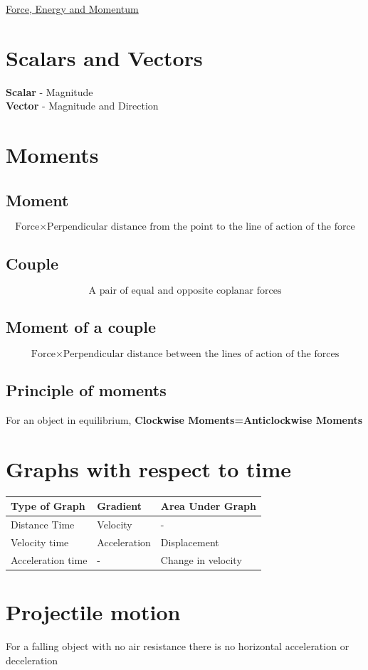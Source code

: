 \documentclass{article}[18pt]
\begin{document}
\begin{center}
\underline{\huge Force, Energy and Momentum}
\end{center}
\section{Scalars and Vectors}
\textbf{Scalar} - Magnitude\\
\textbf{Vector} - Magnitude and Direction
\section{Moments}
\subsection{Moment}
$$\text{Force}\times \text{Perpendicular distance from the point to the line of action of the force}$$
\subsection{Couple}
$$\text{A pair of equal and opposite coplanar forces}$$
\subsection{Moment of a couple}
$$\text{Force}\times\text{Perpendicular distance between the lines of action of the forces}$$
\subsection{Principle of moments}
\begin{center}
For an object in equilibrium, \textbf{Clockwise Moments=Anticlockwise Moments}
\end{center}
\section{Graphs with respect to time}
\begin{tabularx}{\textwidth}{|X|X|X|}
\hline
\textbf{Type of Graph}&\textbf{Gradient}&\textbf{Area Under Graph}\\
\hline
Distance Time&Velocity&-\\
\hline
Velocity time&Acceleration&Displacement\\
\hline
Acceleration time&-&Change in velocity\\
\hline
\end{tabularx}
\section{Projectile motion}
For a falling object with no air resistance there is no horizontal acceleration or deceleration 
\end{document}
